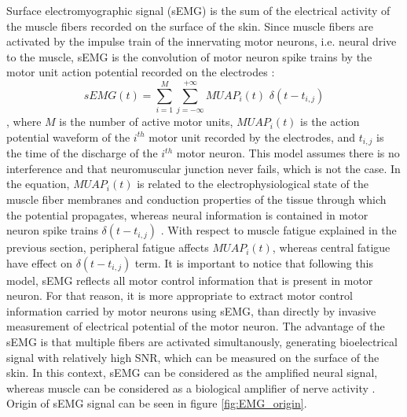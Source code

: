 Surface electromyographic signal (sEMG) is the sum of the electrical activity of the muscle fibers recorded on the surface of the skin. Since muscle fibers are activated by the impulse train of the innervating motor neurons, i.e. neural drive to the muscle, sEMG is the convolution of motor neuron spike trains by the motor unit action potential recorded on the electrodes \citep{Farina2010, Farina2014}:
\begin{equation}
sEMG(t) = \sum_{i=1}^{M} \sum_{j=-\infty}^{+\infty} MUAP_i(t)\,\, \delta(t-t_{i,j})
\end{equation}
, where $M$ is the number of active motor units, $MUAP_i(t)$ is the action potential waveform of the $i^{th}$ motor unit recorded by the electrodes, and $t_{i,j}$ is the time of the discharge of the $i^{th}$ motor neuron. This model assumes there is no interference and that neuromuscular junction never fails, which is not the case. In the equation, $MUAP_i(t)$ is related to the electrophysiological state of the muscle fiber membranes and conduction properties of the tissue through which the potential propagates, whereas neural information is contained in motor neuron spike trains $\delta(t-t_{i,j})$ \citep{Farina2014b}. With respect to muscle fatigue explained in the previous section, peripheral fatigue affects $MUAP_i(t)$, whereas central fatigue have effect on $\delta(t-t_{i,j})$ term. It is important to notice that following this model, sEMG reflects all motor control information that is present in motor neuron. For that reason, it is more appropriate to extract motor control information carried by motor neurons using sEMG, than directly by invasive measurement of electrical potential of the motor neuron. The advantage of the sEMG is that multiple fibers are activated simultanously, generating bioelectrical signal with relatively high SNR, which can be measured on the surface of the skin. In this context, sEMG can be considered as the amplified neural signal, whereas muscle can be considered as a biological amplifier of nerve activity \citep{Farina2014}. Origin of sEMG signal can be seen in figure \ref{fig:EMG_origin}.
